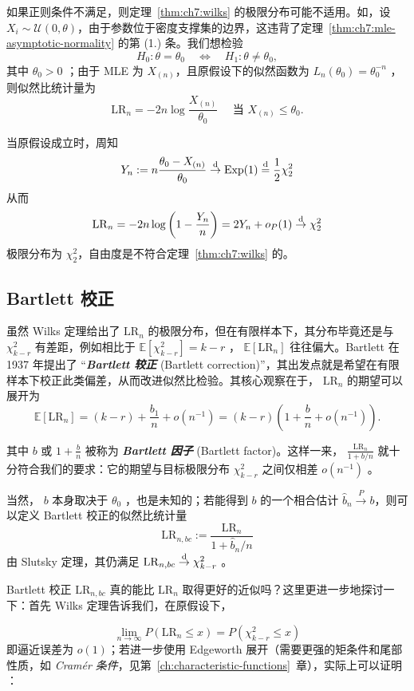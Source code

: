 \begin{example}
如果正则条件不满足，则定理~\ref{thm:ch7:wilks} 的极限分布可能不适用。如，设 $X_i \sim \mathcal U(0,\theta)$，由于参数位于密度支撑集的边界，这违背了定理~\ref{thm:ch7:mle-asymptotic-normality} 的第 (1.) 条。我们想检验
\[
H_0: \theta = \theta_0\quad \iff\quad H_1:\theta\ne \theta_0,
\]
其中 $\theta_0>0$ ；由于 MLE 为 $X_{(n)}$，且原假设下的似然函数为 $L_n(\theta_0)=\theta_0^{-n}$ ，则似然比统计量为
\[
\mathrm{LR}_n = -2n \log\frac{X_{(n)}}{\theta_0}\quad \text{ 当 }X_{(n)}\le \theta_0.
\]

当原假设成立时，周知 \[ Y_n:=n\frac{\theta_0-X_{(n)}}{\theta_0}\overset{\rm d}\to\mathrm{Exp}(1)\overset{\rm d}=\frac12\chi_2^2 \]从而 \[ \mathrm{LR}_n=-2n\log\left(1-\frac{Y_n}n\right)=2Y_n+o_P(1)\overset{\rm d}\to \chi_2^2 \]极限分布为 $\chi^2_2$，自由度是不符合定理~\ref{thm:ch7:wilks} 的。


\end{example}

\subsection{Bartlett 校正}

虽然 Wilks 定理给出了 $\mathrm{LR}_n$ 的极限分布，但在有限样本下，其分布毕竟还是与 $\chi^2_{k-r}$ 有差距，例如相比于 $\mathbb{E}[\chi^2_{k-r}]=k-r$ ， $\mathbb{E}[\mathrm{LR}_n]$ 往往偏大。Bartlett 在 1937 年提出了 ``\textbf{\emph{Bartlett 较正}} (Bartlett correction)''，其出发点就是希望在有限样本下校正此类偏差，从而改进似然比检验。其核心观察在于， $\mathrm{LR}_n$ 的期望可以展开为
\[
\mathbb{E}[\mathrm{LR}_n] = (k-r) + \frac{b_1}{n} + o(n^{-1}) = (k-r)\left(1 + \frac{b}{n} + o(n^{-1})\right).
\]

其中 $b$ 或 $1 + \frac{b}{n}$ 被称为 \textbf{\emph{Bartlett 因子}} (Bartlett factor)。这样一来， $\tfrac{\mathrm{LR}_n}{1+b/n}$ 就十分符合我们的要求：它的期望与目标极限分布 $\chi^2_{k-r}$ 之间仅相差 $o(n^{-1})$ 。

当然， $b$ 本身取决于 $\theta_0$ ，也是未知的；若能得到 $b$ 的一个相合估计 $\widehat{b}_n \stackrel{P}\to b$，则可以定义 Bartlett 校正的似然比统计量 
$$\mathrm{LR}_{n, bc} := \frac{\mathrm{LR}_n}{1 + \widehat{b}_n / n}$$
由 Slutsky 定理，其仍满足 $\mathrm{LR}_{n, bc}\overset{\rm d}\to \chi^2_{k-r}$ 。

Bartlett 校正 $\mathrm{LR}_{n, bc}$ 真的能比 $\mathrm{LR}_{n}$ 取得更好的近似吗？这里更进一步地探讨一下：首先 Wilks 定理告诉我们，在原假设下， 

$$\lim_{n \to \infty} P(\mathrm{LR}_n \le x) = P(\chi^2_{k-r} \le x)$$
即逼近误差为 $o(1)$；若进一步使用 Edgeworth 展开（需要更强的矩条件和尾部性质，如 \emph{Cramér 条件}，见第~\ref{ch:characteristic-functions}~章），实际上可以证明 \cite{hayakawa1977,chandraghosh1979}：


